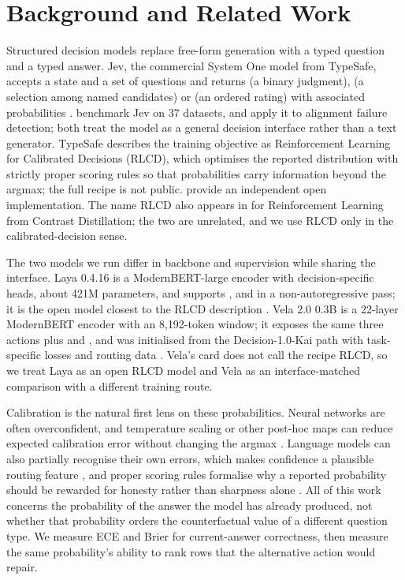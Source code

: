 \section{Background and Related Work}

Structured decision models replace free-form generation with a typed question
and a typed answer. Jev, the commercial System One model from TypeSafe, accepts
a state and a set of questions and returns \noul{} (a binary judgment),
\choice{} (a selection among named candidates) or \score{} (an ordered rating)
with associated probabilities \citep{typesafe2026}. \citet{deusser2026jev}
benchmark Jev on 37 datasets, and \citet{guo2026justask} apply it to alignment
failure detection; both treat the model as a general decision interface rather
than a text generator. TypeSafe describes the training objective as
Reinforcement Learning for Calibrated Decisions (RLCD), which optimises the
reported distribution with strictly proper scoring rules so that probabilities
carry information beyond the argmax; the full recipe is not public.
\citet{gao2026openjev} provide an independent open implementation. The name
RLCD also appears in \citet{yang2023rlcd} for Reinforcement Learning from
Contrast Distillation; the two are unrelated, and we use RLCD only in the
calibrated-decision sense.

The two models we run differ in backbone and supervision while sharing the
interface. Laya 0.4.16 is a ModernBERT-large encoder with decision-specific
heads, about 421M parameters, and supports \noul{}, \choice{} and \score{} in a
non-autoregressive pass; it is the open model closest to the RLCD description
\citep{laya2026,layastudio2026}. Vela 2.0 0.3B is a 22-layer ModernBERT encoder
with an 8{,}192-token window; it exposes the same three actions plus \spanact{}
and \setact{}, and was initialised from the Decision-1.0-Kai \choice{} path with
task-specific losses and routing data \citep{vllm2026vela,warner2024modernbert}.
Vela's card does not call the recipe RLCD, so we treat Laya as an open RLCD
model and Vela as an interface-matched comparison with a different training
route.

Calibration is the natural first lens on these probabilities. Neural networks
are often overconfident, and temperature scaling or other post-hoc maps can
reduce expected calibration error without changing the argmax
\citep{guo2017calibration}. Language models can also partially recognise their
own errors, which makes confidence a plausible routing feature
\citep{kadavath2022know}, and proper scoring rules formalise why a reported
probability should be rewarded for honesty rather than sharpness alone
\citep{gneiting2007scoring}. All of this work concerns the probability of the
answer the model has already produced, not whether that probability orders the
counterfactual value of a different question type. We measure ECE and Brier for
current-answer correctness, then measure the same probability's ability to rank
rows that the alternative action would repair.

